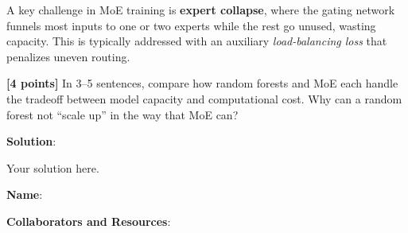 \documentclass[submit]{../harvardml}
\newenvironment{solution}{
    \vspace{2mm}
    \color{blue}\noindent\textbf{Solution}:
}{}
\begin{document}
\begin{problem}
\begin{enumerate}
A key challenge in MoE training is \textbf{expert collapse}, where the gating network funnels most inputs to one or two experts while the rest go unused, wasting capacity. This is typically addressed with an auxiliary \emph{load-balancing loss} that penalizes uneven routing.

\textbf{[4 points]} In 3--5 sentences, compare how random forests and MoE each handle the tradeoff between model capacity and computational cost. Why can a random forest not ``scale up'' in the way that MoE can?
\end{enumerate}

\end{problem}

\begin{solution}
	Your solution here.
\end{solution}


\newpage 




\textbf{Name}:

\textbf{Collaborators and Resources}: 
\end{document}
